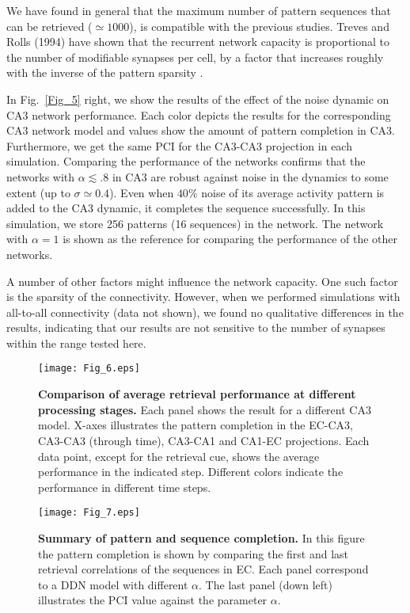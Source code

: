 \documentclass[utf8]{frontiersSCNS} %
\begin{document}
We have found in general that the maximum number of pattern sequences that can be retrieved ($\simeq 1000$), is compatible with the previous studies. Treves and Rolls (1994) have shown that the recurrent network capacity is proportional to the number of modifiable synapses per cell, by a factor that increases roughly with the inverse of the pattern sparsity \cite{treves1994computational}. 
%

In Fig.~\ref{Fig_5} right, we show the results of the effect of the noise dynamic on CA3 network performance. Each color depicts the results for the corresponding CA3 network model and values show the amount of pattern completion in CA3.
Furthermore, we get the same PCI for the CA3-CA3 projection in each simulation.
Comparing the performance of the networks confirms that the networks with $\alpha \lesssim .8$ in CA3 are robust against noise in the dynamics to some extent (up to $\sigma \simeq 0.4$). Even when $ 40 \% $ noise of its average activity pattern is added to the CA3 dynamic, it completes the sequence successfully. In this simulation, we store 256 patterns (16 sequences) in the network. The network with $\alpha = 1$ is shown as the reference for comparing the performance of the other networks.    

A number of other factors might influence the network capacity. One such factor is the sparsity of the connectivity. However, when we performed simulations with all-to-all connectivity (data not shown), we found no qualitative differences in the results, indicating that our results are not sensitive to the number of synapses within the range tested here. 

\begin{figure}[!htb]
\centering\texttt{[image: Fig\_6.eps]}
\caption{\textbf{Comparison of average retrieval performance at different processing stages.}
Each panel shows the result for a different CA3 model. X-axes illustrates the pattern completion in the EC-CA3, CA3-CA3 (through time), CA3-CA1 and CA1-EC projections. Each data point, except for the retrieval cue, shows the average performance in the indicated step. Different colors indicate the performance in different time steps.}
\label{Fig_6}
\end{figure}

\begin{figure}[!htb]
\centering\texttt{[image: Fig\_7.eps]}
\caption{\textbf{Summary of pattern and sequence completion.} In this figure the pattern completion is shown by comparing the first and last retrieval correlations of the sequences in EC. Each panel correspond to a  DDN model with different $\alpha$. The last panel (down left) illustrates the PCI value against the parameter $\alpha$.}
\label{Fig_7}
\end{figure}
\end{document}
